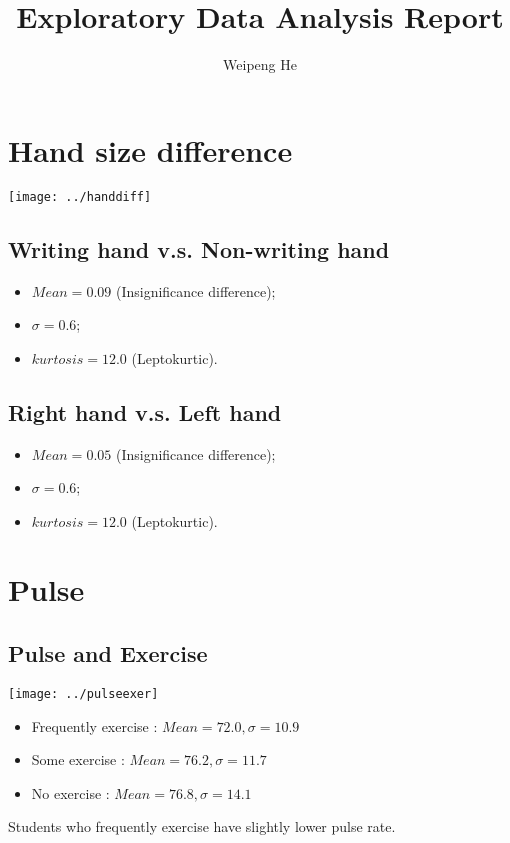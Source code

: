 \documentclass[a4paper,11pt]{article}
\title{Exploratory Data Analysis Report}
\author{Weipeng He}
\begin{document}
\maketitle

\section{Hand size difference}
\begin{center}
  \texttt{[image: ../handdiff]}
\end{center}

\subsection{Writing hand v.s. Non-writing hand}
\begin{itemize}
  \item $Mean = 0.09$ (Insignificance difference);
  \item $\sigma = 0.6$;
  \item $kurtosis = 12.0$ (Leptokurtic).
\end{itemize}

\subsection{Right hand v.s. Left hand}
\begin{itemize}
  \item $Mean = 0.05$ (Insignificance difference);
  \item $\sigma = 0.6$;
  \item $kurtosis = 12.0$ (Leptokurtic).
\end{itemize}

\section{Pulse}
\subsection{Pulse and Exercise}
\begin{center}
  \texttt{[image: ../pulseexer]}
\end{center}

\begin{itemize}
  \item Frequently exercise : $Mean = 72.0, \sigma = 10.9$
  \item Some exercise : $Mean = 76.2, \sigma = 11.7$
  \item No exercise : $Mean = 76.8, \sigma = 14.1$
\end{itemize}
Students who frequently exercise have slightly lower pulse rate.
\end{document}
